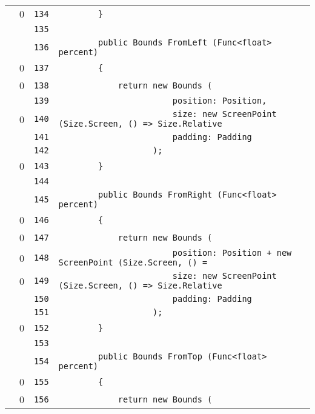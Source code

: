 \documentclass[a4paper,10pt]{article}
\begin{document}
\begin{longtable}[l]{lrrl}
\cellcolor{red} & 0 & \verb~134~ & \verb~        }~\\
\cellcolor{gray} &  & \verb~135~ & \verb~~\\
\cellcolor{gray} &  & \verb~136~ & \verb~        public Bounds FromLeft (Func<float> percent)~\\
\cellcolor{red} & 0 & \verb~137~ & \verb~        {~\\
\cellcolor{red} & 0 & \verb~138~ & \verb~            return new Bounds (~\\
\cellcolor{gray} &  & \verb~139~ & \verb~                       position: Position,~\\
\cellcolor{red} & 0 & \verb~140~ & \verb~                       size: new ScreenPoint (Size.Screen, () => Size.Relative~\\
\cellcolor{gray} &  & \verb~141~ & \verb~                       padding: Padding~\\
\cellcolor{gray} &  & \verb~142~ & \verb~                   );~\\
\cellcolor{red} & 0 & \verb~143~ & \verb~        }~\\
\cellcolor{gray} &  & \verb~144~ & \verb~~\\
\cellcolor{gray} &  & \verb~145~ & \verb~        public Bounds FromRight (Func<float> percent)~\\
\cellcolor{red} & 0 & \verb~146~ & \verb~        {~\\
\cellcolor{red} & 0 & \verb~147~ & \verb~            return new Bounds (~\\
\cellcolor{red} & 0 & \verb~148~ & \verb~                       position: Position + new ScreenPoint (Size.Screen, () =~\\
\cellcolor{red} & 0 & \verb~149~ & \verb~                       size: new ScreenPoint (Size.Screen, () => Size.Relative~\\
\cellcolor{gray} &  & \verb~150~ & \verb~                       padding: Padding~\\
\cellcolor{gray} &  & \verb~151~ & \verb~                   );~\\
\cellcolor{red} & 0 & \verb~152~ & \verb~        }~\\
\cellcolor{gray} &  & \verb~153~ & \verb~~\\
\cellcolor{gray} &  & \verb~154~ & \verb~        public Bounds FromTop (Func<float> percent)~\\
\cellcolor{red} & 0 & \verb~155~ & \verb~        {~\\
\cellcolor{red} & 0 & \verb~156~ & \verb~            return new Bounds (~\\

\end{longtable}
\end{document}

